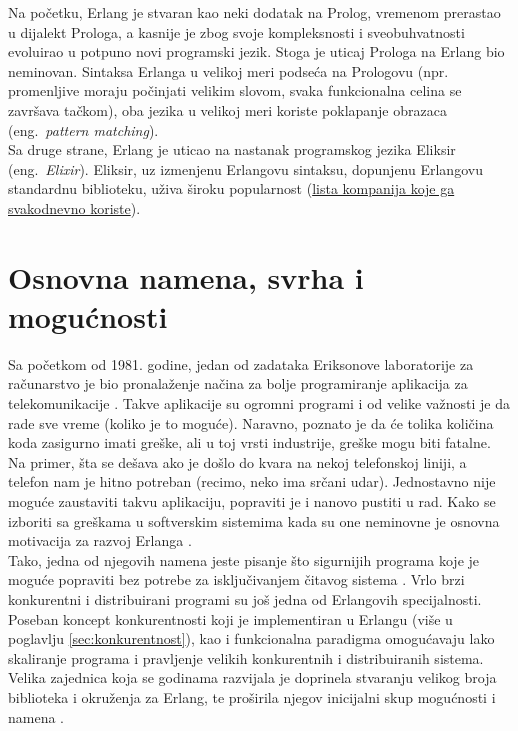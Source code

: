 \documentclass[a4paper]{article}
\begin{document}
{Na početku, Erlang je stvaran kao neki dodatak na Prolog, vremenom prerastao u 
dijalekt Prologa, a kasnije je zbog svoje kompleksnosti i sveobuhvatnosti evoluirao
u potpuno novi programski jezik. Stoga je uticaj Prologa na Erlang bio 
neminovan. Sintaksa Erlanga u velikoj meri podseća na Prologovu 
(npr. promenljive moraju počinjati velikim slovom, 
svaka funkcionalna celina se završava tačkom), oba jezika u velikoj meri koriste poklapanje obrazaca
(eng.~{\em pattern matching}). \\

Sa druge strane, Erlang je uticao na nastanak programskog jezika Eliksir (eng.~{\em Elixir}). Eliksir,
uz izmenjenu Erlangovu sintaksu, dopunjenu Erlangovu standardnu biblioteku, uživa široku popularnost 
(\href{https://elixir-companies.com/}{lista kompanija koje ga svakodnevno koriste}). 

\section{Osnovna namena, svrha i mogućnosti}
\label{sec:namena}
Sa početkom od 1981. godine, jedan od zadataka Eriksonove laboratorije za računarstvo je bio pronalaženje načina za bolje programiranje aplikacija
za telekomunikacije \cite{phdthesis}. Takve aplikacije su ogromni programi i od velike važnosti je da rade sve vreme (koliko je to moguće). 
Naravno, poznato je da će tolika količina koda zasigurno imati greške, ali u toj vrsti industrije, greške mogu biti fatalne. Na primer, 
šta se dešava ako je došlo do kvara na nekoj telefonskoj liniji, a telefon nam je hitno potreban (recimo, neko ima srčani udar).
Jednostavno nije moguće zaustaviti takvu aplikaciju, popraviti je i nanovo pustiti u rad.
Kako se izboriti sa greškama u softverskim sistemima kada su one neminovne je osnovna motivacija za razvoj Erlanga \cite{phdthesis}. \\

Tako, jedna od njegovih namena jeste pisanje što sigurnijih programa koje je moguće popraviti bez potrebe za isključivanjem čitavog sistema \cite{book_joe}.
Vrlo brzi konkurentni i distribuirani programi su još jedna od Erlangovih specijalnosti. 
Poseban koncept konkurentnosti koji je implementiran u Erlangu (više u poglavlju \ref{sec:konkurentnost}), kao i funkcionalna paradigma 
omogućavaju lako skaliranje programa i pravljenje velikih konkurentnih i distribuiranih sistema.
Velika zajednica koja se godinama razvijala je doprinela stvaranju velikog broja biblioteka i okruženja za Erlang, te proširila njegov 
inicijalni skup mogućnosti i namena \cite{book_joe}. 


}
\end{document}
